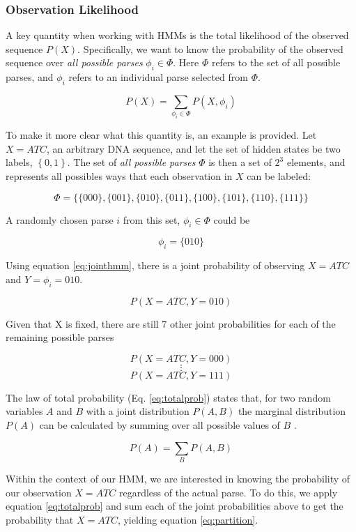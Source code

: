 \subsubsection{Observation Likelihood}
A key quantity when working with HMMs is the total likelihood of the observed sequence $P(X)$. Specifically, we want to know the probability of the observed sequence over \emph{all possible parses} $\phi_i \in \Phi$. Here $\Phi$ refers to the set of all possible parses, and $\phi_i$ refers to an individual parse selected from $\Phi$. 

\begin{equation}
 P(X) = \sum_{\phi_i \in \Phi}{P(X,\phi_i)}  
\label{eq:partition}
\end{equation}

To make it more clear what this quantity is, an example is provided. Let $X = ATC$, an arbitrary DNA sequence, and let the set of hidden states be two labels, $\left\{0,1\right\}$. The set of \emph{all possible parses} $\Phi$ is then a set of $2^3$ elements, and represents all possibles ways that each observation in $X$ can be labeled:

$$\Phi = \{\{000\},\{001\},\{010\},\{011\},\{100\},\{101\},\{110\},\{111\}\}$$

A randomly chosen parse $i$ from this set, $\phi_i \in \Phi$ could be

$$\phi_i = \{010\}$$

Using equation \ref{eq:jointhmm}, there is a joint probability of observing $X=ATC$ and $Y = \phi_i = 010$.

$$P(X=ATC,Y=010)$$

Given that X is fixed, there are still 7 other joint probabilities for each of the remaining possible parses

$$P(X=ATC,Y=000)$$
$$\vdots$$
$$P(X=ATC,Y=111)$$

The law of total probability (Eq. \ref{eq:totalprob}) states that, for two random variables $A$ and $B$ with a joint distribution $P(A,B)$ the marginal distribution $P(A)$ can be calculated by summing over all possible values of $B$ \cite{Brookes1951FoundationsProbability}.

\begin{equation}
    P(A) = \sum_B{P(A,B)}
\label{eq:totalprob}
\end{equation}

Within the context of our HMM, we are interested in knowing the probability of our observation $X=ATC$ regardless of the actual parse. To do this, we apply equation \ref{eq:totalprob} and sum each of the joint probabilities above to get the probability that $X=ATC$, yielding equation \ref{eq:partition}.

